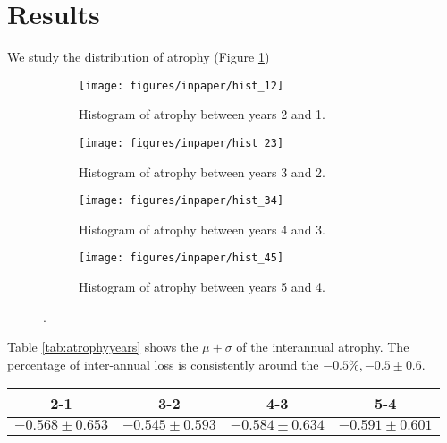 \documentclass[twoside,onecolumn]{article}
\begin{document}





\section{Results}

We study the distribution of atrophy (Figure \ref{fig:hist})

\begin{figure}[!htb]
    \centering
    \begin{subfigure}[t]{0.45\textwidth}
        \centering
        \texttt{[image: figures/inpaper/hist\_12]}
        \caption{Histogram of atrophy between years 2 and 1.}
    \end{subfigure}
    \hfill
    \begin{subfigure}[t]{0.45\textwidth}
        \centering
        \texttt{[image: figures/inpaper/hist\_23]}
        \caption{Histogram of atrophy between years 3 and 2.}
    \end{subfigure}%
    
    \begin{subfigure}[t]{0.45\textwidth}
        \centering
        \texttt{[image: figures/inpaper/hist\_34]}
        \caption{Histogram of atrophy between years 4 and 3.}
    \end{subfigure}
    \hfill
    \begin{subfigure}[t]{0.45\textwidth}
        \centering
        \texttt{[image: figures/inpaper/hist\_45]}
        \caption{Histogram of atrophy between years 5 and 4.}
    \end{subfigure}%
\caption{.}
\label{fig:hist}
\end{figure}

Table \ref{tab:atrophyyears} shows the $\mu + \sigma$ of the interannual atrophy. The percentage of inter-annual loss is consistently around the $-0.5\%, -0.5 \pm  0.6$.
\begin{center}
 \begin{tabular}{||c c c c||} 
 \hline
 2-1 & 3-2 & 4-3 & 5-4  \\ [0.5ex] 
 \hline\hline
 $-0.568 \pm 0.653$ & $-0.545 \pm 0.593$  & $-0.584 \pm 0.634$ & $-0.591 \pm 0.601$\\ [0.5ex] 
 \hline
\end{tabular}
 \label{tab:atrophyyears}
\end{center}
\end{document}
